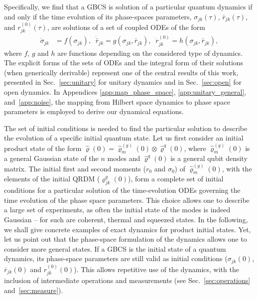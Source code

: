 \documentclass[%
reprint,
superscriptaddress,
nofootinbib,
 amsmath,amssymb,
prx,
floatfix,
]{revtex4-2}
\begin{document}
Specifically, we find that a GBCS is solution of a particular quantum dynamics if and only if the time evolution of its phase-spaces parameters, $\sigma_{jk}(\tau)$, $\bar{r}_{jk}(\tau)$,  and $r^{(0)}_{jk} (\tau)  $,  are solutions of a set of coupled ODEs of the form
\begin{align}
   \dot{\sigma}_{jk} &= f(\sigma_{jk}), \;\;
   \dot{\bar{r}}_{jk} = g(\sigma_{jk}, \bar{r}_{jk}), \;\;
   \dot{r}_{jk}^{(0)} = h(\sigma_{jk}, \bar{r}_{jk}),  \nonumber
\end{align}
 where $f$, $g$ and $h$ are functions depending on the considered type of dynamics. The explicit forms of the sets of ODEs and the integral form of their solutions (when generically derivable) represent one of the central results of this work, presented in Sec.~\ref{sec:unitary} for unitary dynamics and in Sec.~\ref{sec:open} for open dynamics. In Appendices \ref{app:map_phase_space}, \ref{app:unitary_general}, and~\ref{app:noise}, the mapping from Hilbert space dynamics to phase space parameters is employed to derive our dynamical equations.

The set of initial conditions is needed to find the particular solution to describe the evolution of a specific initial quantum state. Let us first consider an initial product state of the form $\hat{\varrho}(0) = \hat{\varrho}_m^{(g)} (0) \otimes \hat{\varrho}^q (0) $, where $\hat{\varrho}_m^{(g)} (0) $ is a general Gaussian state of the $n$ modes and $\hat{\varrho}^q (0)$ is a general qubit density matrix. The initial first and second moments ($r_0$ and $\sigma_0$) of $\hat{\varrho}_m^{(g)} (0) $, with the elements of the initial QRDM ($\varrho^q_{jk} (0)$), form a complete set of initial conditions for a particular solution of the time-evolution ODEs governing the time evolution of the phase space parameters. This choice allows one to describe a large set of experiments, as often the initial state of the modes is indeed Gaussian -- for such are coherent, thermal and squeezed states. In the following, we shall give concrete examples of exact dynamics for product initial states.  Yet, let us point out that the phase-space formulation of the dynamics allows one to consider more general states. If a GBCS is the initial state of a quantum dynamics, its phase-space parameters are still valid as initial conditions ($\sigma_{jk}(0)$, $\bar{r}_{jk}(0)$ and  $r_{jk}^{(0)}(0)$). This allows repetitive use of the dynamics, with the inclusion of intermediate operations and measurements (see Sec.~\ref{sec:operations} and~\ref{sec:measure}).
\end{document}
